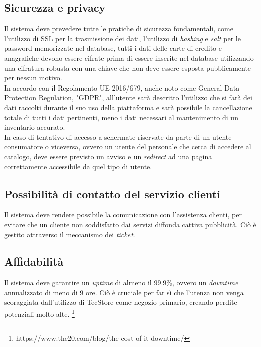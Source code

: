\documentclass[12pt,a4paper]{article}
\begin{document}
\subsection{Sicurezza e privacy}
\label{sec:security}
Il sistema deve prevedere tutte le pratiche di sicurezza fondamentali, come l'utilizzo di SSL per la trasmissione dei dati, l'utilizzo di \textit{hashing} e \textit{salt} per le password memorizzate nel database, tutti i dati delle carte di credito e anagrafiche devono essere cifrate prima di essere inserite nel database utilizzando una cifratura robusta con una chiave che non deve essere esposta pubblicamente per nessun motivo. \\
In accordo con il Regolamento UE 2016/679, anche noto come General Data Protection Regulation, "GDPR", all'utente sarà descritto l'utilizzo che si farà dei dati raccolti durante il suo uso della piattaforma e sarà possibile la cancellazione totale di tutti i dati pertinenti, meno i dati necessari al mantenimento di un inventario accurato. \\
In caso di tentativo di accesso a schermate riservate da parte di un utente consumatore o viceversa, ovvero un utente del personale che cerca di accedere al catalogo, deve essere previsto un avviso e un \textit{redirect} ad una pagina correttamente accessibile da quel tipo di utente.


\subsection{Possibilità di contatto del servizio clienti}
Il sistema deve rendere possibile la comunicazione con l'assistenza clienti, per evitare che un cliente non soddisfatto dai servizi diffonda cattiva pubblicità. Ciò è gestito attraverso il meccanismo dei \textit{ticket}.

\subsection{Affidabilità}
Il sistema deve garantire un \emph{uptime} di almeno il 99.9\%, ovvero un \textit{downtime} annualizzato di meno di 9 ore. Ciò è cruciale per far sì che l'utenza non venga scoraggiata dall'utilizzo di TecStore come negozio primario, creando perdite potenziali molto alte. \footnote{https://www.the20.com/blog/the-cost-of-it-downtime/}
\end{document}
